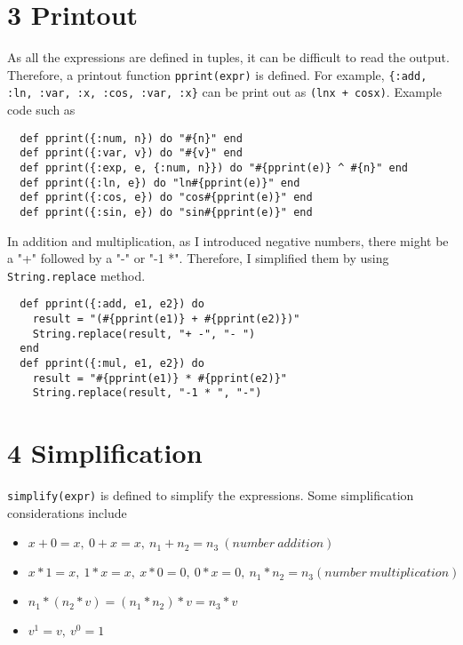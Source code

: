 \documentclass[a4paper,11pt]{article}
\begin{document}
\section*{3 Printout}
As all the expressions are defined in tuples, it can be difficult to read the output. Therefore, a printout function {\tt pprint(expr)} is defined.
For example, {\tt \{:add, {:ln, {:var, :x}}, {:cos, {:var, :x}}\}} can be print out as {\tt(lnx + cosx)}. Example code such as
\begin{verbatim}
  def pprint({:num, n}) do "#{n}" end
  def pprint({:var, v}) do "#{v}" end
  def pprint({:exp, e, {:num, n}}) do "#{pprint(e)} ^ #{n}" end
  def pprint({:ln, e}) do "ln#{pprint(e)}" end
  def pprint({:cos, e}) do "cos#{pprint(e)}" end
  def pprint({:sin, e}) do "sin#{pprint(e)}" end
\end{verbatim}

In addition and multiplication, as I introduced negative numbers, there might be a "+" followed by a "-" or "-1 *". Therefore, I simplified them by using {\tt String.replace} method.
\begin{verbatim}
  def pprint({:add, e1, e2}) do
    result = "(#{pprint(e1)} + #{pprint(e2)})"
    String.replace(result, "+ -", "- ")
  end
  def pprint({:mul, e1, e2}) do
    result = "#{pprint(e1)} * #{pprint(e2)}"
    String.replace(result, "-1 * ", "-")
\end{verbatim}

\section*{4 Simplification}
{\tt simplify(expr)} is defined to simplify the expressions. Some simplification considerations include
\begin{itemize}
  \item $x + 0 = x,\ 0 + x = x,\ n_1 + n_2 = n_3\ (number\ addition)$
  \item $x * 1 = x,\ 1 * x = x,\ x * 0 = 0,\ 0 * x = 0,\ n_1 * n_2 = n_3 (number\ multiplication)$
  \item $n_1 * (n_2 * v) = (n_1 * n_2) * v = n_3 * v$
  \item $v^1 = v,\ v^0 = 1$
\end{itemize}
\end{document}
